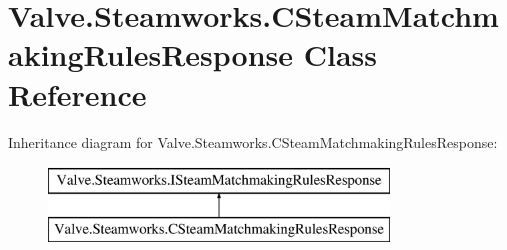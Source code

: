 \hypertarget{classValve_1_1Steamworks_1_1CSteamMatchmakingRulesResponse}{}\section{Valve.\+Steamworks.\+C\+Steam\+Matchmaking\+Rules\+Response Class Reference}
\label{classValve_1_1Steamworks_1_1CSteamMatchmakingRulesResponse}
Inheritance diagram for Valve.\+Steamworks.\+C\+Steam\+Matchmaking\+Rules\+Response\+:\begin{figure}[H]
\begin{center}
\leavevmode
\includegraphics[height=2.000000cm]{classValve_1_1Steamworks_1_1CSteamMatchmakingRulesResponse}
\end{center}
\end{figure}
